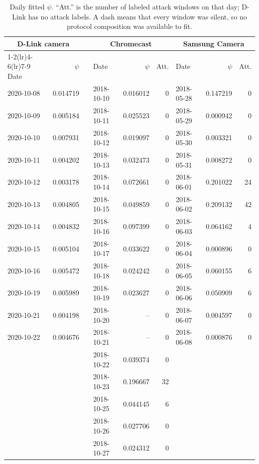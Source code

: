 \documentclass[11pt]{article}
\begin{document}
\begin{table}[htbp]
\centering
\small
\caption{Daily fitted \(\psi\). ``Att.'' is the number of labeled attack
windows on that day; D-Link has no attack labels. A dash means that every
window was silent, so no protocol composition was available to fit.}
\label{tab:daily-psi}
\begin{tabular}{l r @{}c l r r l r r}
\toprule
\multicolumn{2}{c}{D-Link camera} &&
\multicolumn{3}{c}{Chromecast} &
\multicolumn{3}{c}{Samsung Camera} \\
\cmidrule(lr){1-2}\cmidrule(lr){4-6}\cmidrule(lr){7-9}
Date & \(\psi\) && Date & \(\psi\) & Att. & Date & \(\psi\) & Att. \\
\midrule
2020-10-08 & 0.014719 && 2018-10-10 & 0.016012 & 0 & 2018-05-28 & 0.147219 & 0 \\
2020-10-09 & 0.005184 && 2018-10-11 & 0.025523 & 0 & 2018-05-29 & 0.000942 & 0 \\
2020-10-10 & 0.007931 && 2018-10-12 & 0.019097 & 0 & 2018-05-30 & 0.003321 & 0 \\
2020-10-11 & 0.004202 && 2018-10-13 & 0.032473 & 0 & 2018-05-31 & 0.008272 & 0 \\
2020-10-12 & 0.003178 && 2018-10-14 & 0.072661 & 0 & 2018-06-01 & 0.201022 & 24 \\
2020-10-13 & 0.004805 && 2018-10-15 & 0.049859 & 0 & 2018-06-02 & 0.209132 & 42 \\
2020-10-14 & 0.004832 && 2018-10-16 & 0.097399 & 0 & 2018-06-03 & 0.064162 & 4 \\
2020-10-15 & 0.005104 && 2018-10-17 & 0.033622 & 0 & 2018-06-04 & 0.000896 & 0 \\
2020-10-16 & 0.005472 && 2018-10-18 & 0.024242 & 0 & 2018-06-05 & 0.060155 & 6 \\
2020-10-19 & 0.005989 && 2018-10-19 & 0.023627 & 0 & 2018-06-06 & 0.050909 & 6 \\
2020-10-21 & 0.004198 && 2018-10-20 & -- & 0 & 2018-06-07 & 0.004597 & 0 \\
2020-10-22 & 0.004676 && 2018-10-21 & -- & 0 & 2018-06-08 & 0.000876 & 0 \\
&&& 2018-10-22 & 0.039374 & 0 &&& \\
&&& 2018-10-23 & 0.196667 & 32 &&& \\
&&& 2018-10-25 & 0.044145 & 6 &&& \\
&&& 2018-10-26 & 0.027706 & 0 &&& \\
&&& 2018-10-27 & 0.024312 & 0 &&& \\
\bottomrule
\end{tabular}
\end{table}
\end{document}
